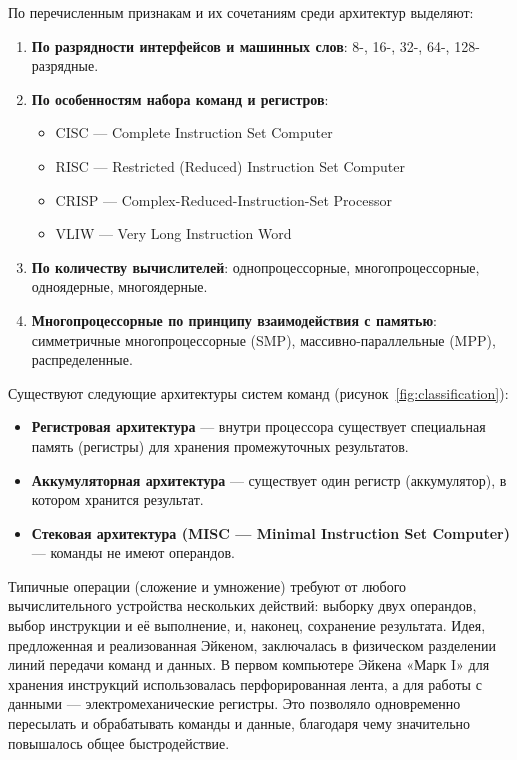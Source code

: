 \bigskip
По перечисленным признакам и их сочетаниям среди архитектур выделяют:
\begin{enumerate}
    \item \textbf{По разрядности интерфейсов и машинных слов}: 8-, 16-, 32-, 64-, 128-разрядные.
    \item \textbf{По особенностям набора команд и регистров}:
          \begin{itemize}
              \item CISC --- Complete Instruction Set Computer
              \item RISC --- Restricted (Reduced) Instruction Set Computer
              \item CRISP --- Complex-Reduced-Instruction-Set Processor
              \item VLIW --- Very Long Instruction Word
          \end{itemize}
    \item \textbf{По количеству вычислителей}: однопроцессорные, многопроцессорные, одноядерные, многоядерные.
    \item \textbf{Многопроцессорные по принципу взаимодействия с памятью}: симметричные многопроцессорные (SMP), массивно-параллельные (MPP), распределенные.
\end{enumerate}

Существуют следующие архитектуры систем команд (рисунок~\ref{fig:classification}):
\begin{itemize}
    \item \textbf{Регистровая архитектура} --- внутри процессора существует специальная память (регистры) для хранения промежуточных результатов.
    \item \textbf{Аккумуляторная архитектура} --- существует один регистр (аккумулятор), в котором хранится результат.
    \item \textbf{Стековая архитектура (MISC --- Minimal Instruction Set Computer)} --- команды не имеют операндов.
\end{itemize}

Типичные операции (сложение и умножение) требуют от любого вычислительного устройства нескольких действий: выборку двух операндов, выбор инструкции и её выполнение, и, наконец, сохранение результата.
Идея, предложенная и  реализованная Эйкеном, заключалась в физическом разделении линий передачи команд и данных.
В первом компьютере Эйкена «Марк I» для хранения инструкций использовалась перфорированная лента, а для работы с данными --- электромеханические регистры.
Это позволяло одновременно пересылать и обрабатывать команды и данные, благодаря чему значительно повышалось общее быстродействие.

